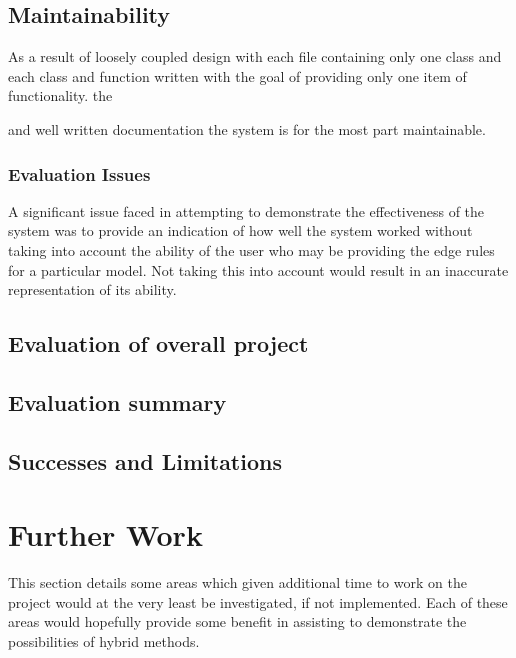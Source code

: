\documentclass{article}
\begin{document}
\subsection{Maintainability}
As a result of loosely coupled design with each file containing only one class and each class and function written with the goal of providing only one item of functionality. the 

and well written documentation the system is for the most part maintainable. 


\subsubsection{Evaluation Issues}
A significant issue faced in attempting to demonstrate the effectiveness of the system was to provide an indication of how well the system worked without taking into account the ability of the user who may be providing the edge rules for a particular model. Not taking this into account would result in an inaccurate representation of its ability.

\subsection{Evaluation of overall project}

% 


\subsection{Evaluation summary}

\subsection{Successes and Limitations}


\section{Further Work}
This section details some areas which given additional time to work on the project would at the very least be investigated, if not implemented. Each of these areas would hopefully provide some benefit in assisting to demonstrate the possibilities of hybrid methods.
\end{document}
